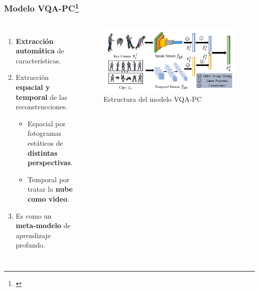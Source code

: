 \begin{frame}
  \frametitle{Modelo VQA-PC\footnote[frame]{\cite{VQA-PC}}}
  \begin{columns}
    \begin{enumerate}
      \item \textbf{Extracción automática} de características.
      \item Extracción \textbf{espacial y temporal} de las reconstrucciones.
        \begin{itemize}
          \item Espacial por fotogramas estáticos de \textbf{distintas perspectivas}.
          \item Temporal por tratar la \textbf{nube como video}.
        \end{itemize}
      \item Es como un \textbf{meta-modelo} de aprendizaje profundo. 
    \end{enumerate}
    \begin{figure}
      \begin{center}
        \includegraphics[width=\textwidth]{imagenes/chapter3/PipelineCompleto}
      \end{center}
      \caption{Estructura del modelo VQA-PC\footnotemark[11]}
    \end{figure}
  \end{columns}
\end{frame}

